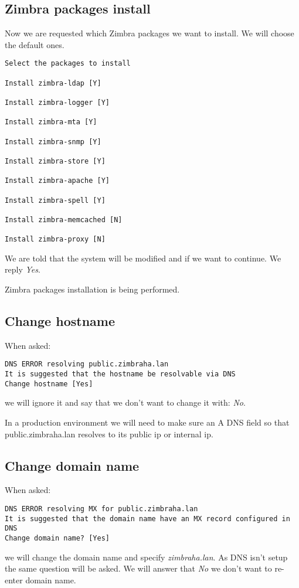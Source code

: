 \subsection {\label{subsec:zimbra-packages-install}Zimbra packages install}
Now we are requested which Zimbra packages we want to install. We will choose the default ones.

\begin{verbatim}
Select the packages to install

Install zimbra-ldap [Y] 

Install zimbra-logger [Y] 

Install zimbra-mta [Y] 

Install zimbra-snmp [Y] 

Install zimbra-store [Y] 

Install zimbra-apache [Y] 

Install zimbra-spell [Y] 

Install zimbra-memcached [N] 

Install zimbra-proxy [N] 
\end{verbatim}

We are told that the system will be modified and if we want to continue. We reply \textit{Yes}.

Zimbra packages installation is being performed.

\subsection {Change hostname}
When asked:
\begin{verbatim}
DNS ERROR resolving public.zimbraha.lan
It is suggested that the hostname be resolvable via DNS
Change hostname [Yes]
\end{verbatim}
we will ignore it and say that we don't want to change it with: \textit{No}.

In a production environment we will need to make sure an A DNS field so that public.zimbraha.lan resolves to its public ip or internal ip.

\subsection {Change domain name}
When asked:
\begin{verbatim}
DNS ERROR resolving MX for public.zimbraha.lan
It is suggested that the domain name have an MX record configured in DNS
Change domain name? [Yes] 
\end{verbatim}
we will change the domain name and specify \textit{zimbraha.lan}. As DNS isn't setup the same question will be asked. We will answer that \textit{No} we don't want to re-enter domain name.

